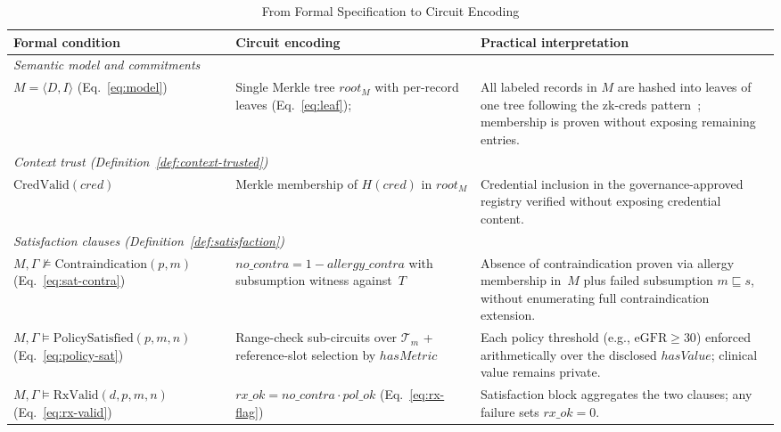 \documentclass[journal]{IEEEtran}
\begin{document}
\begin{table}[!t]
\centering
\caption{From Formal Specification to Circuit Encoding}
\label{tab:formal-to-circuit}
\footnotesize
\renewcommand{\arraystretch}{1.15}
\begin{tabular}{p{3.8cm} p{4.2cm} p{5.5cm}}
\toprule
\textbf{Formal condition} & \textbf{Circuit encoding} & \textbf{Practical interpretation} \\
\midrule
\multicolumn{3}{l}{\textit{Semantic model and commitments}} \\
$M = \langle D, I \rangle$\; (Eq.~\ref{eq:model}) &
  Single Merkle tree $\mathit{root}_M$ with per-record leaves (Eq.~\ref{eq:leaf}); &
  All labeled records in $M$ are hashed into leaves of one tree following the zk-creds pattern~\cite{rosenberg2023zkcreds}; membership is proven without exposing remaining entries. \\
\midrule
\multicolumn{3}{l}{\textit{Context trust (Definition~\ref{def:context-trusted})}} \\
$\mathrm{CredValid}(\mathit{cred})$ &
  Merkle membership of $H(\mathit{cred})$ in $\mathit{root}_M$ &
  Credential inclusion in the governance-approved registry verified without exposing credential content. \\
\midrule
\multicolumn{3}{l}{\textit{Satisfaction clauses (Definition~\ref{def:satisfaction})}} \\
$M, \Gamma \not\models \mathrm{Contraindication}(p, m)$\; (Eq.~\ref{eq:sat-contra}) &
  $\mathit{no\_contra} = 1 - \mathit{allergy\_contra}$ with subsumption witness against~$T$ &
  Absence of contraindication proven via allergy membership in~$M$ plus failed subsumption $m \sqsubseteq s$, without enumerating full contraindication extension. \\
$M, \Gamma \models \mathrm{PolicySatisfied}(p, m, n)$\; (Eq.~\ref{eq:policy-sat}) &
  Range-check sub-circuits over $\mathcal{T}_m$ + reference-slot selection by $\mathit{hasMetric}$ &
  Each policy threshold (e.g., $\mathrm{eGFR} \geq 30$) enforced arithmetically over the disclosed $\mathit{hasValue}$; clinical value remains private. \\

$M, \Gamma \models \mathrm{RxValid}(d,p,m,n)$\; (Eq.~\ref{eq:rx-valid}) &
  $\mathit{rx\_ok} = \mathit{no\_contra} \cdot \mathit{pol\_ok}$\; (Eq.~\ref{eq:rx-flag}) &
  Satisfaction block aggregates the two clauses; any failure sets $\mathit{rx\_ok} = 0$. \\


\end{tabular}
\end{table}
\end{document}
